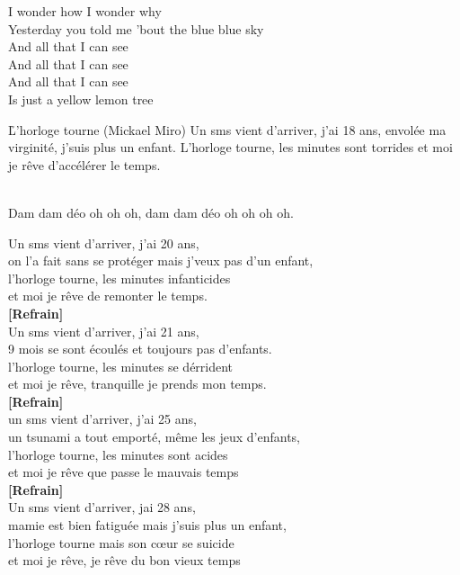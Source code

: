 \documentclass{novel}
\begin{document}
I wonder how I wonder why \\
Yesterday you told me 'bout the blue blue sky \\
And all that I can see \\
And all that I can see \\
And all that I can see \\
Is just a yellow lemon tree

\newpage
\normalsize
\h*{L’horloge tourne (Mickael Miro)}
Un sms vient d'arriver, j'ai 18 ans,
envolée ma virginité, j'suis plus un enfant.
L'horloge tourne, les minutes sont torrides
et moi je rêve d'accélérer le temps.
\begin{bfseries}
[Refrain:]\\
Dam dam déo oh oh oh, dam dam déo oh oh oh oh.\\
\end{bfseries}

Un sms vient d'arriver, j'ai 20 ans, \\
on l'a fait sans se protéger mais j'veux pas d'un enfant, \\
l'horloge tourne, les minutes infanticides \\
et moi je rêve de remonter le temps. \\

\textbf{[Refrain]}\\

Un sms vient d'arriver, j'ai 21 ans, \\
9 mois se sont écoulés et toujours pas d'enfants. \\
l'horloge tourne, les minutes se dérrident \\
et moi je rêve, tranquille je prends mon temps. \\

\textbf{[Refrain]}\\

un sms vient d'arriver, j'ai 25 ans, \\
un tsunami a tout emporté, même les jeux d'enfants, \\
l'horloge tourne, les minutes sont acides \\
et moi je rêve que passe le mauvais temps \\

\textbf{[Refrain]}\\

Un sms vient d'arriver, jai 28 ans, \\
mamie est bien fatiguée mais j'suis plus un enfant, \\
l'horloge tourne mais son cœur se suicide \\
et moi je rêve, je rêve du bon vieux temps \\
\end{document}
